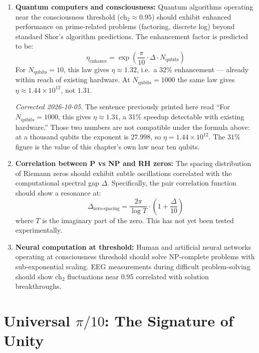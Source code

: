 \begin{enumerate}
\item \textbf{Quantum computers and consciousness:} Quantum algorithms operating near the consciousness threshold ($\text{ch}_2 \approx 0.95$) should exhibit enhanced performance on prime-related problems (factoring, discrete log) beyond standard Shor's algorithm predictions. The enhancement factor is predicted to be:
\begin{equation}
\eta_{\text{enhance}} = \exp\left(\frac{\pi}{10} \cdot \Delta \cdot N_{\text{qubits}}\right)
\end{equation}
For $N_{\text{qubits}} = 10$, this law gives $\eta \approx 1.32$, i.e.\ a
$32\%$ enhancement --- already within reach of existing hardware. At
$N_{\text{qubits}} = 1000$ the same law gives $\eta \approx 1.44\times10^{12}$,
not $1.31$.

\noindent\emph{Corrected 2026-10-05.} The sentence previously printed here read
``For $N_{\text{qubits}} = 1000$, this gives $\eta \approx 1.31$, a 31\% speedup
detectable with existing hardware.'' Those two numbers are not compatible under
the formula above: at a thousand qubits the exponent is $27.998$, so
$\eta = 1.44\times10^{12}$. The $31\%$ figure is the value of this chapter's own
law near ten qubits.

\item \textbf{Correlation between P vs NP and RH zeros:} The spacing distribution of Riemann zeros should exhibit subtle oscillations correlated with the computational spectral gap $\Delta$. Specifically, the pair correlation function should show a resonance at:
\begin{equation}
\Delta_{\text{zero-spacing}} = \frac{2\pi}{\log T} \cdot \left(1 + \frac{\Delta}{10}\right)
\end{equation}
where $T$ is the imaginary part of the zero. This has not yet been tested experimentally.

\item \textbf{Neural computation at threshold:} Human and artificial neural networks operating at consciousness threshold should solve NP-complete problems with sub-exponential scaling. EEG measurements during difficult problem-solving should show $\text{ch}_2$ fluctuations near 0.95 correlated with solution breakthroughs.
\end{enumerate}

\section{Universal \texorpdfstring{$\pi/10$}{pi/10}: The Signature of Unity}

